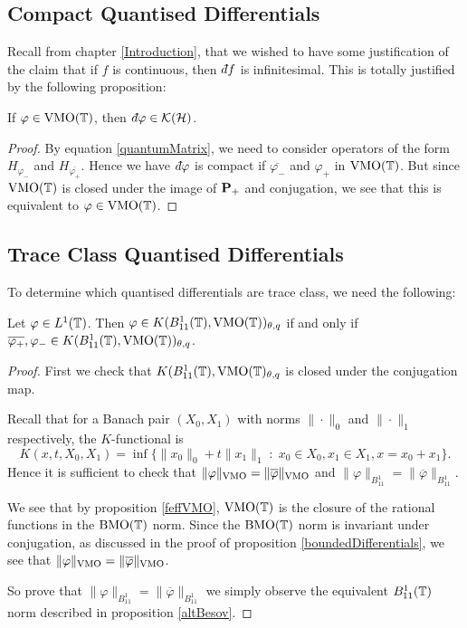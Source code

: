 \subsection{Compact Quantised Differentials}
Recall from chapter \ref{Introduction}, that we wished to have some justification
of the claim that if $f$ is continuous, then $\qd f$ is infinitesimal. This is totally
justified by the following proposition:
\begin{proposition}
    If $\varphi \in \operatorname{VMO}(\mathbb{T})$, then $\qd \varphi \in \mathcal{K}(\Hilb)$.
\end{proposition}
\begin{proof}
    By equation \ref{quantumMatrix}, we need to consider operators of the form $H_{\varphi_-}$
    and $H_{\overline{\varphi_+}}$. Hence we have $\qd \varphi$ is compact
    if $\overline{\varphi_-}$ and $\varphi_+$ in $\operatorname{VMO}(\mathbb{T})$. But 
    since $\operatorname{VMO}(\mathbb{T})$ is closed under the image of $\mathbf{P}_+$ and conjugation,
    we see that this is equivalent to $\varphi \in \operatorname{VMO}(\mathbb{T})$. 
\end{proof}


\subsection{Trace Class Quantised Differentials}


To determine which quantised differentials are trace class, we need
the following:
\begin{lemma}
    Let $\varphi \in L^1(\mathbb{T})$. Then $\varphi \in K(B_{11}^1(\mathbb{T}),\operatorname{VMO}(\mathbb{T}))_{\theta,q}$ if and only
    if $\overline{\varphi_+},\varphi_- \in K(B_{11}^1(\mathbb{T}),\operatorname{VMO}(\mathbb{T}))_{\theta,q}$.
\end{lemma}
\begin{proof}
    First we check that $K(B_{11}^1(\mathbb{T}),\operatorname{VMO}(\mathbb{T})_{\theta,q}$
    is closed under the conjugation map. 

    Recall that for a Banach pair $(X_0,X_1)$ with norms $\|\cdot\|_0$ and $\|\cdot\|_1$ 
    respectively,
    the $K$-functional is
    \begin{equation*}
        K(x,t,X_0,X_1) = \inf\{\|x_0\|_0+t\|x_1\|_1\;:\; x_0 \in X_0,x_1 \in X_1,x = x_0+x_1\}.
    \end{equation*}
    Hence it is sufficient to check that $\|\varphi\|_{\operatorname{VMO}} = \|\overline{\varphi}\|_{\operatorname{VMO}}$
    and $\|\varphi\|_{B_{11}^1} = \|\overline{\varphi}\|_{B_{11}^1}$.
    
    We see that by proposition \ref{feffVMO}, $\operatorname{VMO}(\mathbb{T})$
    is the closure of the rational functions in the $\operatorname{BMO}(\mathbb{T})$ norm. Since
    the $\operatorname{BMO}(\mathbb{T})$ norm is invariant under conjugation, as
    discussed in the proof of proposition \ref{boundedDifferentials}, we
    see that $\|\varphi\|_{\operatorname{VMO}} = \|\overline{\varphi}\|_{\operatorname{VMO}}$.
    
    So prove that $\|\varphi\|_{B_{11}^1} = \|\overline{\varphi}\|_{B_{11}^1}$
    we simply observe the equivalent $B_{11}^1(\mathbb{T})$ norm described in
    proposition \ref{altBesov}.
\end{proof}
    

